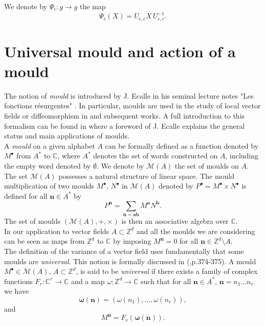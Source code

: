 \documentclass[english,11pt]{amsart}
\def\nn{\mathbf{n}}
\def\aa{\mathbf{a}}
\def\bb{\mathbf{b}}
\def\C{\mathbb{C}}
\def\Z{\mathbb{Z}}
\def\di{\displaystyle}
\def\nn{\mathbf{n}}
\def\oo{\boldsymbol\omega}
\begin{document}
We denote by $\Psi_{\epsilon} : g \rightarrow g$ the map
\begin{equation}
    \Psi_{\epsilon} (X)=U_{\epsilon ,c } X\, U_{\epsilon ,c}^{-1} . 
\end{equation}


\section{Universal mould and action of a mould}
\label{universal}

The notion of {\it mould} is introduced by J. Ecalle in his seminal lecture notes "Les fonctions résurgentes" \cite{ec2}. In particular, moulds are used in the study of local vector fields or diffeomorphism in \cite{ec1} and subsequent works. A full introduction to this formalism can be found in \cite{cr2} where a foreword of J. Ecalle explains the general status and main applications of moulds. \\

A {\it mould} on a given alphabet $A$ can be formally defined as a function denoted by $M^{\bullet}$ from $A^*$ to $\C$, where $A^*$ denotes the set of words constructed on $A$, including the empty word denoted by $\emptyset$. We denote by $\mathscr{M} (A)$ the set of moulds on $A$. The set $\mathscr{M} (A)$ possesses a natural structure of linear space. The mould multiplication of two moulds $M^{\bullet}$, $N^{\bullet}$ in $\mathscr{M} (A)$ denoted by $P^{\bullet} =M^{\bullet} \times N^{\bullet}$ is defined for all $\nn \in A^*$ by 
\begin{equation}
    P^{\nn} =\di\sum_{\nn =\aa \bb} M^{\aa} N^{\bb} .
\end{equation}
The set of moulds $(\mathscr{M} (A) , +,\times )$ is then an associative algebra over $\C$.\\

In our application to vector fields $A \subset \Z^d$ and all the moulds we are considering can be seen as maps from $\Z^d$ to $\C$ by imposing $M^{\nn} =0$ for all $\nn \in \Z^d \setminus A$.\\

The definition of the variance of a vector field uses fundamentally that some moulds are 
{\it universal}. This notion is formally discussed in (\cite{cr2},p.374-375). A mould $M^{\bullet} \in \mathscr{M} (A)$, $A\subset \Z^d$, is said to be {\it universal} if there exists a family of complex functions $F_r :\C^r \rightarrow \C$ and a map $\omega : \Z^d \rightarrow \C$ such that for all $\nn \in A^*$, $\nn =n_1 \dots n_r$ we have 
\begin{equation}
    \oo ( \nn )= (\omega (n_1 ),\dots ,\omega (n_r ) ),
\end{equation}
and
\begin{equation}
    M^{\nn} = F_r (\oo (\nn ) ) .
\end{equation}
\end{document}
